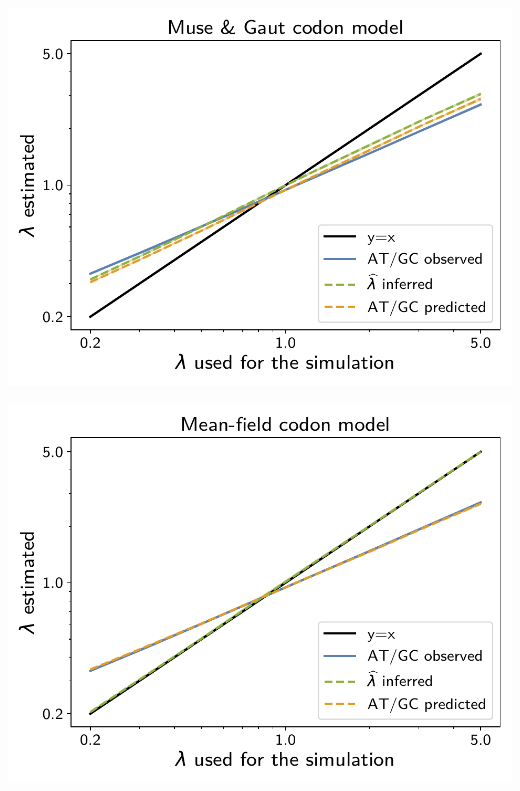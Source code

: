 \documentclass{article}
\begin{document}
\begin{center}
    \begin{minipage}{0.325\linewidth}
        \includegraphics[width=\linewidth, page=1]{inference_supp_mat/PrimatesExons10Mu4.0_lambda_MG.pdf}
    \end{minipage}
    \hfill
    \begin{minipage}{0.325\linewidth}
        \includegraphics[width=\linewidth, page=1]{inference_supp_mat/PrimatesExons10Mu4.0_lambda_MF.pdf}
    \end{minipage}
    \hfill

\end{center}
\end{document}

